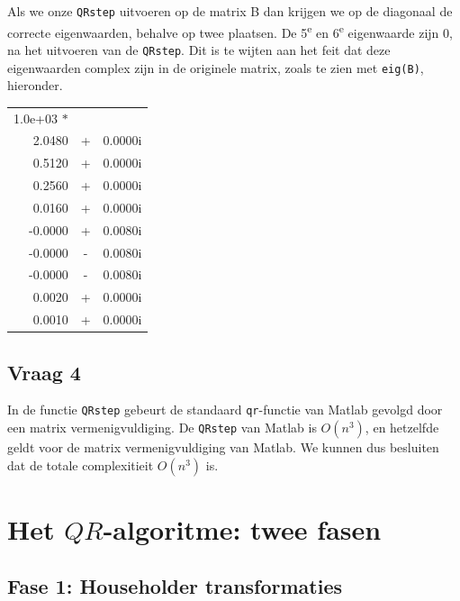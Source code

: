 \documentclass{article}
\begin{document}
Als we onze \texttt{QRstep} uitvoeren op de matrix B dan krijgen we op de diagonaal de correcte eigenwaarden, behalve op twee plaatsen. De 5\textsuperscript{e} en 6\textsuperscript{e} eigenwaarde zijn 0, na het uitvoeren van de \texttt{QRstep}. Dit is te wijten aan het feit dat deze eigenwaarden complex zijn in de originele matrix, zoals te zien met \texttt{eig(B)}, hieronder.

\begin{table}[H]
\selectfont
\begin{tabular}{rcr}
   1.0e+03 $*$&&\\
   2.0480 &+ &0.0000i\\
   0.5120 &+ &0.0000i\\
   0.2560 &+ &0.0000i\\
   0.0160 &+ &0.0000i\\
   {\color{red} -0.0000} &{\color{red}+} &{\color{red}0.0080i}\\
   {\color{red}-0.0000} &{\color{red}-}&{\color{red}0.0080i}\\
  -0.0000 &- &0.0080i\\
   0.0020 &+ &0.0000i\\
   0.0010 &+ &0.0000i
   \end{tabular}
   \end{table}

\subsection*{Vraag 4}
In de functie \texttt{QRstep} gebeurt de standaard \texttt{qr}-functie van Matlab gevolgd door een matrix vermenigvuldiging. De \texttt{QRstep} van Matlab is $O(n^3)$, en hetzelfde geldt voor de matrix vermenigvuldiging van Matlab. We kunnen dus besluiten dat de totale complexitieit $O(n^3)$ is.

\section{ Het $QR$-algoritme: twee fasen}

\subsection{Fase 1: Householder transformaties}
\end{document}
